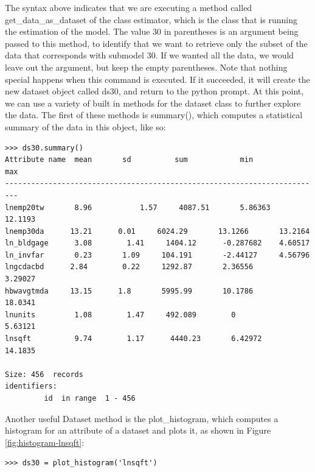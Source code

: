 The syntax above indicates that we are executing a method called get\_data\_as\_dataset of the class estimator, which is the class that is running the estimation of the model.  The value 30 in parentheses is an argument being passed to this method, to identify that we want to retrieve only the subset of the data that corresponds with submodel 30.  If we wanted all the data, we would leave out the argument, but keep the empty parentheses.  Note that nothing special happens when this command is executed.  If it succeeded, it will create the new dataset object called ds30, and return to the python prompt.  At this point, we can use a variety of built in methods for the dataset class to further explore the data.  The first of these methods is summary(), which computes a statistical summary of the data in this object, like so:\\

\begin{lstlisting}
>>> ds30.summary()
Attribute name	mean       sd	       sum            min             max
-------------------------------------------------------------------------
lnemp20tw       8.96	       1.57     4087.51       5.86363       12.1193
lnemp30da      13.21      0.01     6024.29       13.1266       13.2164
ln_bldgage      3.08        1.41     1404.12      -0.287682    4.60517
ln_invfar       0.23       1.09     104.191       -2.44127     4.56796
lngcdacbd      2.84        0.22     1292.87       2.36556       3.29027
hbwavgtmda     13.15      1.8       5995.99       10.1786       18.0341
lnunits         1.08        1.47     492.089        0            5.63121
lnsqft          9.74        1.17      4440.23       6.42972      14.1835

Size: 456  records
identifiers: 
         id  in range  1 - 456
\end{lstlisting}


Another useful Dataset method is the plot\_histogram, which computes a histogram for an attribute of a dataset and plots it, as shown in Figure \ref{fig:histogram-lnsqft}:\\

\begin{lstlisting}
>>> ds30 = plot_histogram('lnsqft')
\end{lstlisting}

